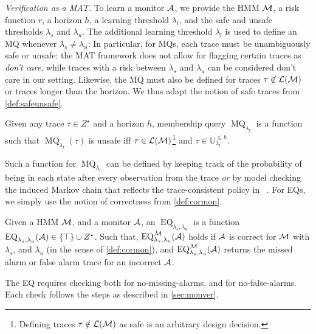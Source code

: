 \documentclass[runningheads]{llncs}
\newcommand{\Obs}{Z}
\newcommand{\unsafetraces}[2]{\mathbb{U}_{#1}^{#2}}
\newcommand{\EQ}{\operatorname{EQ}}
\newcommand{\MQ}{\operatorname{MQ}}
\renewcommand{\paragraph}[1]{\smallskip\noindent\emph{#1}}
\begin{document}
\paragraph{Verification as a MAT.}
To learn a monitor $\mathcal{A}$, we provide the HMM $\mathcal{M}$, a risk function $r$, a horizon $h$, a learning threshold $\lambda_l$, and the safe and unsafe thresholds $\lambda_s$ and $\lambda_u$. The  additional learning threshold $\lambda_l$ is used to define an MQ whenever $\lambda_s \neq \lambda_u$: In particular, for MQs, each trace must be unambiguously safe or unsafe: the MAT framework does not allow for flagging certain traces as \emph{don't care}, while  traces with a risk between $\lambda_s$ and $\lambda_u$ can be considered don't care in our setting.  Likewise, the MQ must also be defined for traces $\tau \not \in \mathcal{L}(\mathcal{M})$ or traces longer than the horizon. We thus adapt the notion of safe traces from \cref{def:safeunsafe}.
\begin{definition}\label{def:toverMQ}
    Given any trace $\tau \in \Obs^\star$ and a horizon $h$, membership query  $\MQ_{\lambda_l}$ is a function such that $\MQ_{\lambda_l}(\tau)$ is unsafe iff $\tau \in \mathcal{L}(\mathcal{M})$\footnote{Defining traces $\tau\notin\mathcal{L}(\mathcal{M})$ as safe is an arbitrary design decision.} and $\tau \in \unsafetraces{\lambda_l}{\leq h}$.
\end{definition}
Such a function for $\MQ_{\lambda_l}$ can be defined by keeping track of the probability of being in each state after every observation from the trace \emph{or} by model checking the induced Markov chain that reflects the trace-consistent policy in ~\cite{rabinerTutorialHiddenMarkov1989, jungesRuntimeMonitorsMarkov2021}.
For EQs, we simply use the notion of correctness from \cref{def:cormon}.
\begin{definition}\label{def:toverEQ}
    Given a HMM $\mathcal{M}$, and a monitor $\mathcal{A}$, an $\EQ_{\lambda_s, \lambda_u}$ is a function $\EQ_{\lambda_s, \lambda_u}(\dfa)\in\{\top\}\cup\Obs^\star$. Such that, $\EQ_{\lambda_s, \lambda_u}^\mc(\dfa)$ holds if $\mathcal{A}$ is correct for $\mathcal{M}$ with $\lambda_s$, and $\lambda_u$ (in the sense of \cref{def:cormon}), and $\EQ_{\lambda_s, \lambda_u}^\mc(\dfa)$ returns the missed alarm or false alarm trace for an incorrect $\mathcal{A}$.
\end{definition}
The EQ requires checking both for no-missing-alarms, and for no-false-alarms. Each check follows the steps as described in \cref{sec:monver}.
\end{document}
